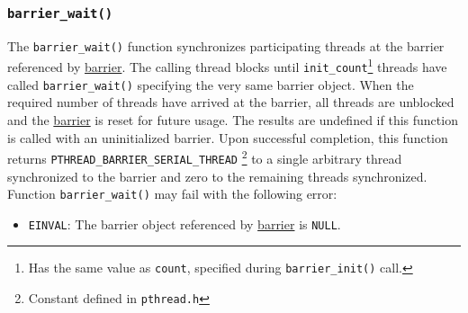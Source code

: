 \documentclass{article}
\def\code#1{\texttt{#1}}
\begin{document}
\subsubsection{\code{barrier\_wait()}}
The \code{barrier\_wait()} function synchronizes participating threads at the barrier referenced
by \underline{barrier}. The calling thread blocks until \code{init\_count}\footnote{Has the same
value as \code{count}, specified during \code{barrier\_init()} call.} threads have called 
\code{barrier\_wait()} specifying the very same barrier object. When the required number of
threads have arrived at the barrier, all threads are unblocked and the \underline{barrier}
is reset for future usage. The results are undefined if this function is called with an
uninitialized barrier. Upon successful completion, this function returns
\code{PTHREAD\_BARRIER\_SERIAL\_THREAD} \footnote{Constant defined in \code{pthread.h}}
to a single arbitrary thread synchronized to the barrier and zero to the remaining threads
synchronized. Function \code{barrier\_wait()} may fail with the following error:
\begin{itemize}
 \item \code{EINVAL}: The barrier object referenced by \underline{barrier} is \code{NULL}.
\end{itemize}
\end{document}
